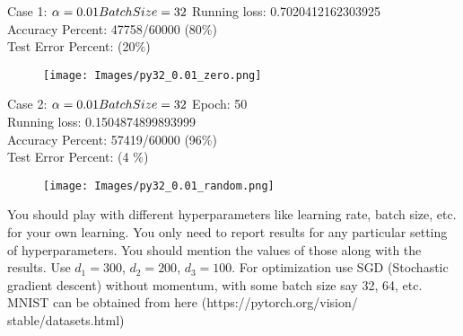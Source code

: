 \documentclass[a4paper]{article}
\theoremstyle{definition}
\newenvironment{soln}{
    \leavevmode\color{blue}\ignorespaces
}{}
\begin{document}
\begin{soln}
     Case 1: $\\
        \alpha = 0.01 \\
        BatchSize = 32 \\
         $
         Running loss:  0.7020412162303925 \\

Accuracy Percent: 47758/60000 (80\%) \\


Test Error Percent: (20\%) \\
\begin{figure}[H]
            
                \centering
                \texttt{[image: Images/py32\_0.01\_zero.png]}
            
        \end{figure}   

        Case 2: $\\
        \alpha = 0.01 \\
        BatchSize = 32 \\
         $
         Epoch:  50 \\
    Running loss:  0.1504874899893999 \\

    Accuracy Percent: 57419/60000 (96\%) \\


Test Error Percent: (4 \%) \\
\begin{figure}[H]
            
                \centering
                \texttt{[image: Images/py32\_0.01\_random.png]}
            
        \end{figure}      


\end{soln}
You should play with different hyperparameters like learning rate, batch size, etc. for your own learning. You only need to report results for any particular setting of hyperparameters. You should mention the values of those along with the results. Use $d_1 = 300$, $d_2 = 200$, $d_3 = 100$. For optimization use SGD (Stochastic gradient descent) without momentum, with some batch size say 32, 64, etc. MNIST can be obtained from here (https://pytorch.org/vision/ stable/datasets.html)


\end{document}
